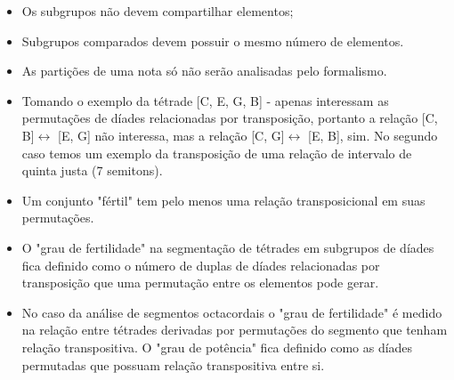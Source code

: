 \documentclass[
	12pt,				%
	openright,			%
	twoside,			%
	a4paper,			%
	english,			%
	french,				%
	spanish,			%
	brazil				%
	]{abntex2}
\begin{document}
\begin{itemize}
\item Os subgrupos não devem compartilhar elementos;
\item Subgrupos comparados devem possuir o mesmo número de elementos. 
\item As partições de uma nota só não serão analisadas pelo formalismo.
\item Tomando o exemplo da tétrade [C, E, G, B] - apenas interessam as permutações de díades relacionadas por transposição, portanto a relação [C, B]$\leftrightarrow $ [E, G] não interessa, mas a relação [C, G]$\leftrightarrow $ [E, B], sim. No segundo caso temos um exemplo da transposição de uma relação de intervalo de quinta justa (7 semitons).
\item Um conjunto "fértil" tem pelo menos uma relação transposicional em suas permutações.
\item O "grau de fertilidade" na segmentação de tétrades em subgrupos de díades fica definido como o número de duplas de díades relacionadas por transposição que uma permutação entre os elementos pode gerar.
\item No caso da análise de segmentos octacordais o "grau de fertilidade" é medido na relação entre tétrades derivadas por permutações do segmento que tenham relação transpositiva. O "grau de potência" fica definido como as díades permutadas que possuam relação transpositiva entre si.

\end{itemize}
\end{document}
